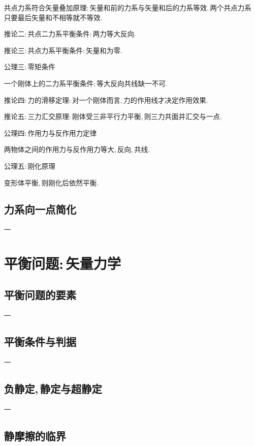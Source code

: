 共点力系符合矢量叠加原理:\,矢量和前的力系与矢量和后的力系等效.\,两个共点力系只要最后矢量和不相等就不等效.

推论二:\,共点二力系平衡条件:\,两力等大反向.

推论三:\,共点力系平衡条件:\,矢量和为零.

\vspace{1cm}
公理三:\,零矩条件

一个刚体上的二力系平衡条件:\,等大反向共线缺一不可.

推论四:\,力的滑移定理:\,对一个刚体而言,\,力的作用线才决定作用效果.

推论五:\,三力汇交原理:\,刚体受三非平行力平衡,\,则三力共面并汇交与一点.

\vspace{1cm}
公理四:\,作用力与反作用力定律

两物体之间的作用力与反作用力等大,\,反向,\,共线.

\vspace{1cm}
公理五:\,刚化原理

变形体平衡,\,则刚化后依然平衡.



\subsection{力系向一点简化}

一

\section{平衡问题:\,矢量力学}

\subsection{平衡问题的要素}

一

\subsection{平衡条件与判据}

一

\subsection{负静定,\,静定与超静定}

一

\subsection{静摩擦的临界}

